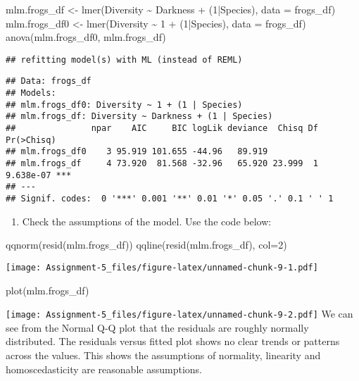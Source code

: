 \documentclass[
]{article}
\newenvironment{Shaded}{\begin{snugshade}}{\end{snugshade}}
\newcommand{\AttributeTok}[1]{\textcolor[rgb]{0.77,0.63,0.00}{#1}}
\newcommand{\DecValTok}[1]{\textcolor[rgb]{0.00,0.00,0.81}{#1}}
\newcommand{\FunctionTok}[1]{\textcolor[rgb]{0.00,0.00,0.00}{#1}}
\newcommand{\NormalTok}[1]{#1}
\newcommand{\OtherTok}[1]{\textcolor[rgb]{0.56,0.35,0.01}{#1}}
\newcommand{\SpecialCharTok}[1]{\textcolor[rgb]{0.00,0.00,0.00}{#1}}
\providecommand{\tightlist}{%
  \setlength{\itemsep}{0pt}\setlength{\parskip}{0pt}}
\begin{document}
\begin{Shaded}
\begin{Highlighting}[]
\NormalTok{mlm.frogs\_df }\OtherTok{\textless{}{-}} \FunctionTok{lmer}\NormalTok{(Diversity }\SpecialCharTok{\textasciitilde{}}\NormalTok{ Darkness }\SpecialCharTok{+}\NormalTok{ (}\DecValTok{1}\SpecialCharTok{|}\NormalTok{Species), }\AttributeTok{data =}\NormalTok{ frogs\_df)}
\NormalTok{mlm.frogs\_df0 }\OtherTok{\textless{}{-}} \FunctionTok{lmer}\NormalTok{(Diversity }\SpecialCharTok{\textasciitilde{}} \DecValTok{1} \SpecialCharTok{+}\NormalTok{ (}\DecValTok{1}\SpecialCharTok{|}\NormalTok{Species), }\AttributeTok{data =}\NormalTok{ frogs\_df)}
\FunctionTok{anova}\NormalTok{(mlm.frogs\_df0, mlm.frogs\_df)}
\end{Highlighting}
\end{Shaded}

\begin{verbatim}
## refitting model(s) with ML (instead of REML)
\end{verbatim}

\begin{verbatim}
## Data: frogs_df
## Models:
## mlm.frogs_df0: Diversity ~ 1 + (1 | Species)
## mlm.frogs_df: Diversity ~ Darkness + (1 | Species)
##               npar    AIC     BIC logLik deviance  Chisq Df Pr(>Chisq)    
## mlm.frogs_df0    3 95.919 101.655 -44.96   89.919                         
## mlm.frogs_df     4 73.920  81.568 -32.96   65.920 23.999  1  9.638e-07 ***
## ---
## Signif. codes:  0 '***' 0.001 '**' 0.01 '*' 0.05 '.' 0.1 ' ' 1
\end{verbatim}

\begin{enumerate}
\def\labelenumi{\alph{enumi}.}
\setcounter{enumi}{4}
\tightlist
\item
  Check the assumptions of the model. Use the code below:
\end{enumerate}

\begin{Shaded}
\begin{Highlighting}[]
\FunctionTok{qqnorm}\NormalTok{(}\FunctionTok{resid}\NormalTok{(mlm.frogs\_df))}
\FunctionTok{qqline}\NormalTok{(}\FunctionTok{resid}\NormalTok{(mlm.frogs\_df), }\AttributeTok{col=}\DecValTok{2}\NormalTok{)}
\end{Highlighting}
\end{Shaded}

\texttt{[image: Assignment-5\_files/figure-latex/unnamed-chunk-9-1.pdf]}

\begin{Shaded}
\begin{Highlighting}[]
\FunctionTok{plot}\NormalTok{(mlm.frogs\_df)}
\end{Highlighting}
\end{Shaded}

\texttt{[image: Assignment-5\_files/figure-latex/unnamed-chunk-9-2.pdf]}
We can see from the Normal Q-Q plot that the residuals are roughly
normally distributed. The residuals versus fitted plot shows no clear
trends or patterns across the values. This shows the assumptions of
normality, linearity and homoscedasticity are reasonable assumptions.
\end{document}
